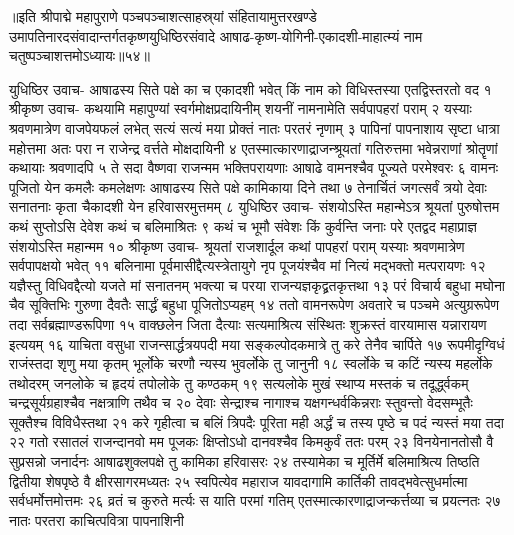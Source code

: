 ॥इति श्रीपाद्मे महापुराणे पञ्चपञ्चाशत्साहस्र्यां संहितायामुत्तरखण्डे उमापतिनारदसंवादान्तर्गतकृष्णयुधिष्ठिरसंवादे आषाढ-कृष्ण-योगिनी-एकादशी-माहात्म्यं नाम चतुष्पञ्चाशत्तमोऽध्यायः॥५४॥



युधिष्ठिर उवाच-
आषाढस्य सिते पक्षे का च एकादशी भवेत् 
किं नाम को विधिस्तस्या एतद्विस्तरतो वद १
श्रीकृष्ण उवाच-
कथयामि महापुण्यां स्वर्गमोक्षप्रदायिनीम् 
शयनीं नामनामेति सर्वपापहरां पराम् २
यस्याः श्रवणमात्रेण वाजपेयफलं लभेत् 
सत्यं सत्यं मया प्रोक्तं नातः परतरं नृणाम् ३
पापिनां पापनाशाय सृष्टा धात्रा महोत्तमा 
अतः परा न राजेन्द्र वर्त्तते मोक्षदायिनी ४
एतस्मात्कारणाद्राजन्श्रूयतां गतिरुत्तमा 
भवेन्नराणां श्रोतॄणां कथायाः श्रवणादपि ५
ते सदा वैष्णवा राजन्मम भक्तिपरायणाः 
आषाढे वामनश्चैव पूज्यते परमेश्वरः ६
वामनः पूजितो येन कमलैः कमलेक्षणः 
आषाढस्य सिते पक्षे कामिकाया दिने तथा ७
तेनार्चितं जगत्सर्वं त्रयो देवाः सनातनाः 
कृता चैकादशी येन हरिवासरमुत्तमम् ८
युधिष्ठिर उवाच-
संशयोऽस्ति महान्मेऽत्र श्रूयतां पुरुषोत्तम 
कथं सुप्तोऽसि देवेश कथं च बलिमाश्रितः ९
कथं च भूमौ संवेशः किं कुर्वन्ति जनाः परे 
एतद्वद महाप्राज्ञ संशयोऽस्ति महान्मम १०
श्रीकृष्ण उवाच-
श्रूयतां राजशार्दूल कथां पापहरां पराम् 
यस्याः श्रवणमात्रेण सर्वपापक्षयो भवेत् ११
बलिनामा पूर्वमासीद्दैत्यस्त्रेतायुगे नृप 
पूजयंश्चैव मां नित्यं मद्भक्तो मत्परायणः १२
यज्ञैस्तु विधिवद्दैत्यो यजते मां सनातनम् 
भक्त्या च परया राजन्यज्ञकृद्व्रतकृत्तथा १३
परं विचार्य बहुधा मघोना चैव सूक्तिभिः 
गुरुणा दैवतैः सार्द्धं बहुधा पूजितोऽप्यहम् १४
ततो वामनरूपेण अवतारे च पञ्चमे 
अत्युग्ररूपेण तदा सर्वब्रह्माण्डरूपिणा १५
वाक्छलेन जिता दैत्याः सत्यमाश्रित्य संस्थितः 
शुक्रस्तं वारयामास यन्नारायण इत्ययम् १६
याचिता वसुधा राजन्सार्द्धत्रयपदी मया 
सङ्कल्पोदकमात्रे तु करे तेनैव चार्पिते १७
रूपमीदृग्विधं राजंस्तदा शृणु मया कृतम् 
भूर्लोके चरणौ न्यस्य भुवर्लोके तु जानुनी १८
स्वर्लोके च कटिं न्यस्य महर्लोके तथोदरम् 
जनलोके च हृदयं तपोलोके तु कण्ठकम् १९
सत्यलोके मुखं स्थाप्य मस्तकं च तदूर्द्ध्वकम् 
चन्द्रसूर्यग्रहाश्चैव नक्षत्राणि तथैव च २०
देवाः सेन्द्राश्च नागाश्च यक्षगन्धर्वकिन्नराः 
स्तुवन्तो वेदसम्भूतैः सूक्तैश्च विविधैस्तथा २१
करे गृहीत्वा च बलिं त्रिपदैः पूरिता मही 
अर्द्धं च तस्य पृष्ठे च पदं न्यस्तं मया तदा २२
गतो रसातलं राजन्दानवो मम पूजकः 
क्षिप्तोऽधो दानवश्चैव किमकुर्वं ततः परम् २३
विनयेनानतोसौ वै सुप्रसन्नो जनार्दनः 
आषाढशुक्लपक्षे तु कामिका हरिवासरः २४
तस्यामेका च मूर्तिर्मे बलिमाश्रित्य तिष्ठति 
द्वितीया शेषपृष्ठे वै क्षीरसागरमध्यतः २५
स्वपित्येव महाराज यावदागामि कार्तिकी 
तावद्भवेत्सुधर्मात्मा सर्वधर्मोत्तमोत्तमः २६
व्रतं च कुरुते मर्त्यः स याति परमां गतिम् 
एतस्मात्कारणाद्राजन्कर्त्तव्या च प्रयत्नतः २७
नातः परतरा काचित्पवित्रा पापनाशिनी 
